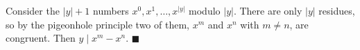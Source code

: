 Consider the $|y|+1$ numbers $x^0,x^1,\dots,x^{|y|}$ modulo $|y|$. There are only $|y|$ residues, so by the pigeonhole principle two of them, $x^m$ and $x^n$ with $m\ne n$, are congruent. Then $y\mid x^m-x^n$. $\blacksquare$
